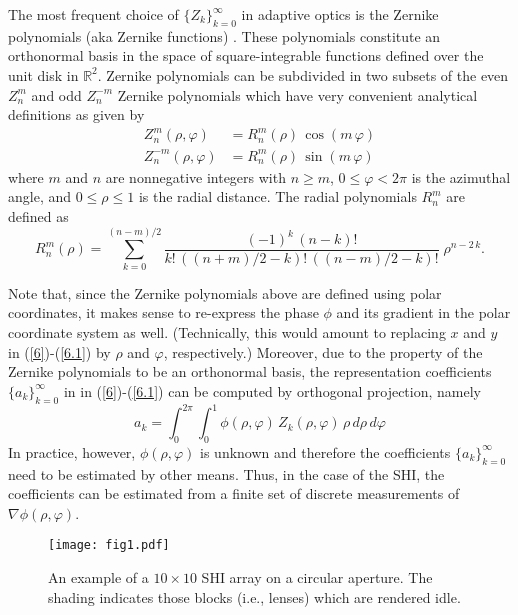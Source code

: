 \pdfoutput=1 \documentclass[journal]{IEEEtran}
\begin{document}
The most frequent choice of $\{Z_k\}_{k=0}^\infty$ in adaptive optics is the Zernike polynomials (aka Zernike functions) \cite{17}. These polynomials constitute an orthonormal basis in the space of square-integrable functions defined over the unit disk in $\mathbb{R}^2$. Zernike polynomials can be subdivided in two subsets of the even $Z_n^m$ and odd $Z_n^{-m}$ Zernike polynomials which have very convenient analytical definitions as given by
\begin{align}
Z^{m}_n(\rho,\varphi) &= R^m_n(\rho)\,\cos(m\,\varphi) \\
Z^{-m}_n(\rho,\varphi) &= R^m_n(\rho)\,\sin(m\,\varphi)
\end{align}
where $m$ and $n$ are nonnegative integers with $n \ge m$, $0 \le \varphi < 2\pi$ is the azimuthal angle, and $0 \le \rho \le 1$ is the radial distance. The radial polynomials $R^m_n$ are defined as
\begin{equation}
R^m_n(\rho) = \! \sum_{k=0}^{(n-m)/2} \!\!\! \frac{(-1)^k\,(n-k)!}{k!\,((n+m)/2-k)!\,((n-m)/2-k)!} \;\rho^{n-2\,k}.
\end{equation}

Note that, since the Zernike polynomials above are defined using polar coordinates, it makes sense to re-express the phase $\phi$ and its gradient in the polar coordinate system as well. (Technically, this would amount to replacing $x$ and $y$ in (\ref{6})-(\ref{6.1}) by $\rho$ and $\varphi$, respectively.) Moreover, due to the property of the Zernike polynomials to be an orthonormal basis, the representation coefficients $\{a_k\}_{k=0}^\infty$ in in (\ref{6})-(\ref{6.1}) can be computed by orthogonal projection, namely
\begin{equation} \label{71}
a_k = \int_0^{2\pi} \int_0^1 \phi(\rho,\varphi) \, Z_k(\rho,\varphi) \, \rho \, d\rho \, d\varphi
\end{equation}
In practice, however, $\phi(\rho,\varphi)$ is unknown and therefore the coefficients $\{a_k\}_{k=0}^\infty$ need to be estimated by other means. Thus, in the case of the SHI, the coefficients can be estimated from a finite set of discrete measurements of $\nabla \phi(\rho,\varphi)$.

\begin{figure}[!t]
\begin{center}
\hspace{-5mm}\texttt{[image: fig1.pdf]}
\caption{An example of a $10 \times 10$ SHI array on a circular aperture. The shading indicates those blocks (i.e., lenses) which are rendered idle.} \label{F1}
\end{center}
\end{figure}
\end{document}
